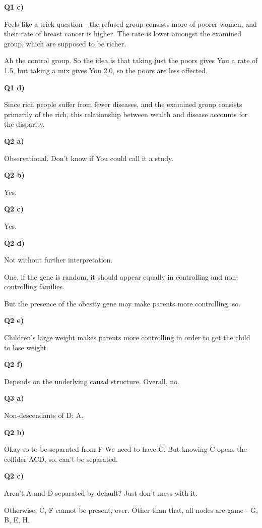 \documentclass{article}
\begin{document}
		\textbf{Q1 c)}
		
			Feels like a trick question - the refused group consists more of poorer women, and their rate of breast cancer is higher. The rate is lower amongst the examined group, which are supposed to be richer.
			
			Ah the control group. So the idea is that taking just the poors gives You a rate of 1.5, but taking a mix gives You 2.0, so the poors are less affected.
			
		\textbf{Q1 d)}
		
			Since rich people suffer from fewer diseases, and the examined group consists primarily of the rich, this relationship between wealth and disease accounts for the disparity.
			
		\textbf{Q2 a)}
		
			Observational. Don't know if You could call it a study.
			
		\textbf{Q2 b)}
		
			Yes.
			
		\textbf{Q2 c)}
		
			Yes.
			
		\textbf{Q2 d)}
		
			Not without further interpretation. 
			
			One, if the gene is random, it should appear equally in controlling and non-controlling families.
			
			But the presence of the obesity gene may make parents more controlling, so.
			
		\textbf{Q2 e)}
		
			Children's large weight makes parents more controlling in order to get the child to lose weight.
			
		\textbf{Q2 f)}
		
			Depends on the underlying causal structure. Overall, no. 
			
		\textbf{Q3 a)}
			
			Non-descendants of D: A.
			
		\textbf{Q2 b)}

			Okay so to be separated from F We need to have C.  But knowing C opens the collider ACD, so, can't be separated.
			
		\textbf{Q2 c)}
				
			Aren't A and D separated by default?  Just don't mess with it.
			
			Otherwise, C, F cannot be present, ever. Other than that, all nodes are game - G, B, E, H.
			
\end{document}
